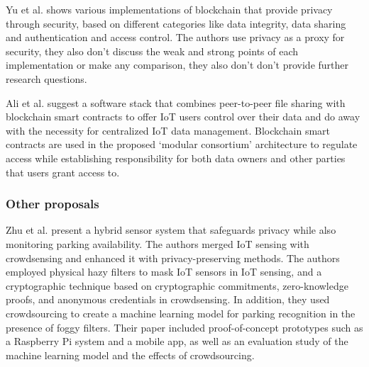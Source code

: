 \documentclass[conference]{IEEEtran}
\begin{document}
Yu et al. \cite{yu2018blockchain} shows various implementations of blockchain
that provide privacy through security, based on different categories like
data integrity, data sharing and authentication and access control. The authors
use privacy as a proxy for security, they also don't discuss the weak and
strong points of each implementation or make any comparison, they also don't
don't provide further research questions.


Ali et al. \cite{AliIoT} suggest a software stack that combines peer-to-peer
file sharing with blockchain smart contracts to offer IoT users control over
their data and do away with the necessity for centralized IoT data management.
Blockchain smart contracts are used in the proposed `modular consortium'
architecture to regulate access while establishing responsibility for both
data owners and other parties that users grant access to.

\subsubsection{Other proposals}


Zhu et al. \cite{ZhuIntegrating} present a hybrid sensor system that safeguards
privacy while also monitoring parking availability. The authors merged IoT
sensing with crowdsensing and enhanced it with privacy-preserving methods.
The authors employed physical hazy filters to mask IoT sensors in IoT sensing,
and a cryptographic technique based on cryptographic commitments, zero-knowledge
proofs, and anonymous credentials in crowdsensing. In addition, they used
crowdsourcing to create a machine learning model for parking recognition
in the presence of foggy filters. Their paper included proof-of-concept prototypes
such as a Raspberry Pi system and a mobile app, as well as an evaluation
study of the machine learning model and the effects of crowdsourcing.
\end{document}
